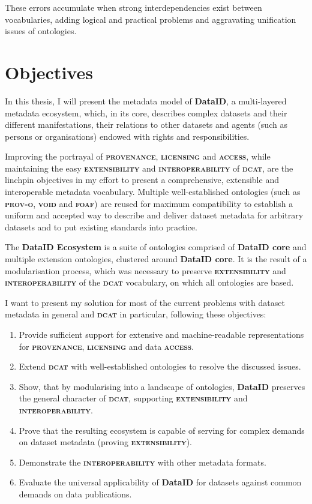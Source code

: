 \documentclass[a4paper,english,twoside,BCOR1.5cm,headsepline,DIV12,appendixprefix,final,12pt]{scrbook}
\newcommand{\provenance}{{\ttfamily\scshape\bfseries provenance}\xspace}
\newcommand{\licensing}{{\ttfamily\scshape\bfseries licensing}\xspace}
\newcommand{\access}{{\ttfamily\scshape\bfseries access}\xspace}
\newcommand{\extensibility}{{\ttfamily\scshape\bfseries extensibility}\xspace}
\newcommand{\interoperability}{{\ttfamily\scshape\bfseries interoperability}\xspace}
\newcommand{\ecosystem}{{\ttfamily\bfseries DataID Ecosystem}\xspace}
\newcommand{\dataid}{{\ttfamily\bfseries DataID}\xspace}
\newcommand{\core}{{\ttfamily\bfseries DataID core}\xspace}
\newcommand{\prov}{{\scshape\bfseries prov-o}\xspace}
\newcommand{\void}{{\scshape\bfseries void}\xspace}
\newcommand{\dcat}{{\scshape\bfseries dcat}\xspace}
\newcommand{\foaf}{{\scshape\bfseries foaf}\xspace}
\begin{document}
These errors accumulate when strong interdependencies exist between
vocabularies, adding logical and practical problems and aggravating unification issues of ontologies.

\section{Objectives}
\label{sec:objectives}
In this thesis, I will present the metadata model of \dataid, a multi-layered metadata ecosystem, which, in its core, describes complex datasets and their different manifestations, their relations to other datasets and agents (such as persons or organisations) endowed with rights and responsibilities.

Improving the portrayal of \provenance, \licensing and \access, while maintaining the easy \extensibility and \interoperability of \dcat, are the linchpin objectives in my effort to present a comprehensive, extensible and interoperable metadata vocabulary.
Multiple well-established ontologies (such as \prov, \void and \foaf) are reused for maximum compatibility to establish a uniform and accepted way to describe and deliver dataset metadata for arbitrary datasets and to put existing standards into practice.

The \ecosystem is a suite of ontologies comprised of \core and multiple extension ontologies, clustered around \core. It is the result of a modularisation process, which was necessary to preserve \extensibility and \interoperability of the \dcat vocabulary, on which all ontologies are based.

I want to present my solution for most of the current problems with dataset metadata in general and \dcat in particular, following these objectives:

\begin{enumerate}
\item Provide sufficient support for extensive and machine-readable representations for \provenance, \licensing and data \access.
\item Extend \dcat with well-established ontologies to resolve the discussed issues.
\item Show, that by modularising into a landscape of ontologies, \dataid preserves the general character of \dcat, supporting \extensibility and \interoperability.
\item Prove that the resulting ecosystem is capable of serving for complex demands on dataset metadata (proving \extensibility).
\item Demonstrate the \interoperability with other metadata formats.
\item Evaluate the universal applicability of \dataid for datasets against common demands on data publications.
\end{enumerate}
\end{document}
